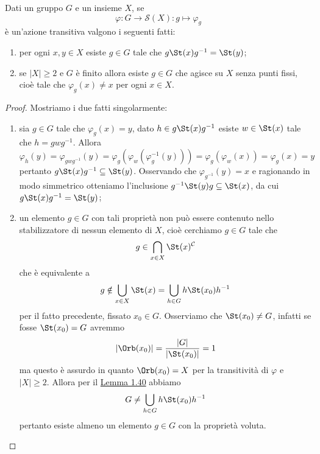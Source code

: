 \documentclass[11pt]{scrartcl}
\begin{document}
\begin{proposition}
    \label{prop1.41}
    Dati un gruppo $G$ e un insieme $X$, se 
    \[
        \varphi:G\longrightarrow \mathcal{S}(X) :g\longmapsto \varphi_g
    \]è un'azione transitiva valgono i seguenti fatti:
    \begin{enumerate}[(1)]
        \item per ogni $x, y \in X$ esiste $g \in G$ tale che $g\St(x)g^{-1} = \St(y)$;
        \item se $|X|\geqslant 2$ e $G$ è finito allora esiste $g \in G$ che agisce su $X$ senza
        punti fissi, cioè tale che $\varphi_g(x) \neq x$ per ogni $x \in X$.
    \end{enumerate}
\end{proposition}

\begin{proof}
    Mostriamo i due fatti singolarmente:
    \begin{enumerate}[(1)]
        \item sia $g \in G$ tale che $\varphi_g(x) = y$, dato 
        $h \in g\St(x)g^{-1}$ esiste $w \in \St(x)$ tale che $h = gwg^{-1}$. 
        Allora
        \[
            \varphi_h(y) = \varphi_{gwg^{-1}}(y) = 
            \varphi_g(\varphi_w(\varphi_g^{-1}(y))) = \varphi_g(\varphi_w(x)) =
            \varphi_g(x) = y
        \]pertanto $g\St(x)g^{-1} \subseteq \St(y)$. Osservando che 
        $\varphi_{g^{-1}}(y) = x$ e ragionando in modo simmetrico otteniamo
        l'inclusione $g^{-1}\St(y)g \subseteq \St(x)$, da cui $g\St(x)g^{-1} = \St(y)$;
        \item un elemento $g \in G$ con tali proprietà non può essere contenuto 
        nello stabilizzatore di nessun elemento di $X$, cioè cerchiamo $g \in G$
        tale che
        \[
            g \in \bigcap_{x \in X}\St(x)^{\mathcal{C}}
        \]
        che è equivalente a
        \[
            g \notin \bigcup_{x \in X} \St(x) = \bigcup_{h \in G}h\St(x_0)h^{-1}
        \]per il fatto precedente, fissato $x_0 \in G$. Osserviamo che 
        $\St(x_0) \neq G$, infatti se fosse $\St(x_0) = G$ avremmo 
        \[
            |\Orb(x_0)| = \frac{|G|}{|\St(x_0)|} = 1
        \]ma questo è assurdo in quanto $\Orb(x_0) = X$ per la transitività di 
        $\varphi$ e $|X|\geqslant 2$. Allora per il \hyperref[lemma1.40]{Lemma 1.40}
        abbiamo 
        \[
            G \neq \bigcup_{h \in G}h\St(x_0)h^{-1}
        \]pertanto esiste almeno un elemento $g\in G$ con la proprietà voluta.
    \end{enumerate}
\end{proof}
\end{document}
